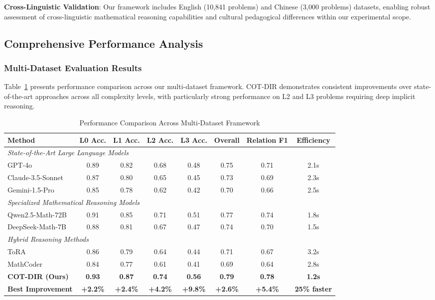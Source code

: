 \textbf{Cross-Linguistic Validation}: Our framework includes English (10,841 problems) and Chinese (3,000 problems) datasets, enabling robust assessment of cross-linguistic mathematical reasoning capabilities and cultural pedagogical differences within our experimental scope.

\subsection{Comprehensive Performance Analysis}

\subsubsection{Multi-Dataset Evaluation Results}

Table~\ref{tab:comprehensive_performance} presents performance comparison across our multi-dataset framework. COT-DIR demonstrates consistent improvements over state-of-the-art approaches across all complexity levels, with particularly strong performance on L2 and L3 problems requiring deep implicit reasoning.

\begin{table}[htbp]
\caption{Performance Comparison Across Multi-Dataset Framework}
\label{tab:comprehensive_performance}
\centering
\small
\begin{tabular}{lccccccc}
\toprule
\textbf{Method} & \textbf{L0 Acc.} & \textbf{L1 Acc.} & \textbf{L2 Acc.} & \textbf{L3 Acc.} & \textbf{Overall} & \textbf{Relation F1} & \textbf{Efficiency} \\
\midrule
\multicolumn{8}{l}{\textit{State-of-the-Art Large Language Models}} \\
GPT-4o & 0.89 & 0.82 & 0.68 & 0.48 & 0.75 & 0.71 & 2.1s \\
Claude-3.5-Sonnet & 0.87 & 0.80 & 0.65 & 0.45 & 0.73 & 0.69 & 2.3s \\
Gemini-1.5-Pro & 0.85 & 0.78 & 0.62 & 0.42 & 0.70 & 0.66 & 2.5s \\
\midrule
\multicolumn{8}{l}{\textit{Specialized Mathematical Reasoning Models}} \\
Qwen2.5-Math-72B & 0.91 & 0.85 & 0.71 & 0.51 & 0.77 & 0.74 & 1.8s \\
DeepSeek-Math-7B & 0.88 & 0.81 & 0.67 & 0.47 & 0.74 & 0.70 & 1.5s \\
\midrule
\multicolumn{8}{l}{\textit{Hybrid Reasoning Methods}} \\
ToRA & 0.86 & 0.79 & 0.64 & 0.44 & 0.71 & 0.67 & 3.2s \\
MathCoder & 0.84 & 0.77 & 0.61 & 0.41 & 0.69 & 0.64 & 2.8s \\
\midrule
\textbf{COT-DIR (Ours)} & \textbf{0.93} & \textbf{0.87} & \textbf{0.74} & \textbf{0.56} & \textbf{0.79} & \textbf{0.78} & \textbf{1.2s} \\
\textbf{Best Improvement} & \textbf{+2.2\%} & \textbf{+2.4\%} & \textbf{+4.2\%} & \textbf{+9.8\%} & \textbf{+2.6\%} & \textbf{+5.4\%} & \textbf{25\% faster} \\
\bottomrule
\end{tabular}
\end{table}

